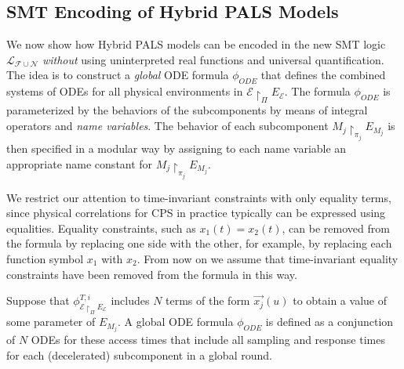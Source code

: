 \subsection{SMT Encoding of Hybrid PALS Models}


We now show how Hybrid PALS models
can be  encoded in the new SMT logic $\mathcal{L}_{\mathcal{F}\cup\mathcal{N}}$
\emph{without}  using uninterpreted real functions and universal quantification.
The idea is to construct a \emph{global} ODE formula $\phi_{\mathit{ODE}}$
that defines the combined systems of ODEs for all physical environments
in $\mathcal{E} \restriction_{\Pi} E_\mathcal{E}$.
The formula $\phi_{\mathit{ODE}}$ is parameterized by the behaviors of 
the subcomponents by means of integral operators and \emph{name variables}.
The behavior of each subcomponent $M_j \restriction_{\pi_j} E_{M_j}$ is then
specified in a modular way by assigning to each name variable an appropriate name constant for $M_j \restriction_{\pi_j} E_{M_j}$.

We restrict our attention to time-invariant constraints with only equality terms,
since physical correlations for CPS in practice typically can be expressed using
equalities.
Equality  constraints, such as $x_1(t) = x_2(t)$,  can be removed
from the formula  by replacing one side with the other, 
for example, by replacing each function symbol $x_1$ with  $x_2$.
From now on we assume that time-invariant equality constraints
have been  removed from the formula 
in this way.



Suppose that %
$\phi_{\mathcal{E} \restriction_{\Pi} E_\mathcal{E}}^{T,i}$ 
includes $N$ terms of the form $\vec{x_j}(u)$ to obtain a value of some parameter of $E_{M_j}$.
A global ODE formula $\phi_{\mathit{ODE}}$
is defined as a conjunction of $N$ ODEs for these access times
that include all sampling and response times for each (decelerated) subcomponent in a global round.


